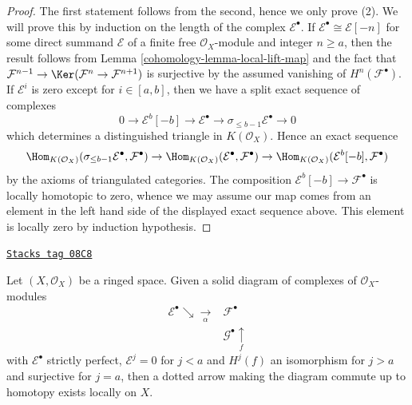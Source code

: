 \begin{proof}

The first statement follows from the second, hence we only prove (2).
We will prove this by induction on the length of the complex
$\mathcal{E}^\bullet$. If $\mathcal{E}^\bullet \cong \mathcal{E}[-n]$
for some direct summand $\mathcal{E}$ of a finite free
$\mathcal{O}_X$-module and integer $n \geq a$, then the result follows from
Lemma \ref{cohomology-lemma-local-lift-map} and the fact that
$\mathcal{F}^{n - 1} \to \Ker(\mathcal{F}^n \to \mathcal{F}^{n + 1})$
is surjective by the assumed vanishing of $H^n(\mathcal{F}^\bullet)$.
If $\mathcal{E}^i$ is zero except for $i \in [a, b]$, then we have a
split exact sequence of complexes
$$
0 \to \mathcal{E}^b[-b] \to \mathcal{E}^\bullet \to
\sigma_{\leq b - 1}\mathcal{E}^\bullet \to 0
$$
which determines a distinguished triangle in
$K(\mathcal{O}_X)$. Hence an exact sequence
$$
\Hom_{K(\mathcal{O}_X)}(
\sigma_{\leq b - 1}\mathcal{E}^\bullet, \mathcal{F}^\bullet)
\to
\Hom_{K(\mathcal{O}_X)}(\mathcal{E}^\bullet, \mathcal{F}^\bullet)
\to
\Hom_{K(\mathcal{O}_X)}(\mathcal{E}^b[-b], \mathcal{F}^\bullet)
$$
by the axioms of triangulated categories. The composition
$\mathcal{E}^b[-b] \to \mathcal{F}^\bullet$ is locally homotopic to
zero, whence we may assume our map comes from an element in the
left hand side of the displayed exact sequence above. This element
is locally zero by induction hypothesis.
\end{proof}

\begin{lemma}
\label{cohomology-lemma-lift-through-quasi-isomorphism}
\href{https://stacks.math.columbia.edu/tag/08C8}{\texttt{Stacks tag 08C8}}

Let $(X, \mathcal{O}_X)$ be a ringed space.
Given a solid diagram of complexes of $\mathcal{O}_X$-modules
$$
\begin{array}{cc}\mathcal{E}^\bullet \searrow\underset{\alpha}{\longrightarrow} & \mathcal{F}^\bullet \\  & \mathcal{G}^\bullet \underset{f}{\uparrow}\end{array}
$$
with $\mathcal{E}^\bullet$ strictly perfect, $\mathcal{E}^j = 0$ for
$j < a$ and $H^j(f)$ an isomorphism for $j > a$ and surjective for $j = a$,
then a dotted arrow making the diagram commute up to homotopy
exists locally on $X$.
\end{lemma}

